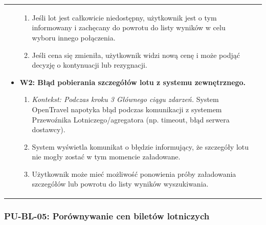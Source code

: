 \documentclass[a4paper,12pt]{article}
\begin{document}
\begin{longtable}{|p{\pierwszakolumnaszerokoscPUBLSzczegoly}|p{\drugakolumnaszerokoscPUBLSzczegoly}|}
\begin{itemize}
\begin{enumerate}
                    \item Jeśli lot jest całkowicie niedostępny, użytkownik jest o tym informowany i zachęcany do powrotu do listy wyników w celu wyboru innego połączenia.
                    \item Jeśli cena się zmieniła, użytkownik widzi nową cenę i może podjąć decyzję o kontynuacji lub rezygnacji.
                \end{enumerate}
            \item \textbf{W2: Błąd pobierania szczegółów lotu z systemu zewnętrznego.}
                \begin{enumerate} \itemsep0pt \parskip0pt \parsep0pt
                    \item \textit{Kontekst: Podczas kroku 3 Głównego ciągu zdarzeń.} System OpenTravel napotyka błąd podczas komunikacji z systemem Przewoźnika Lotniczego/agregatora (np. timeout, błąd serwera dostawcy).
                    \item System wyświetla komunikat o błędzie informujący, że szczegóły lotu nie mogły zostać w tym momencie załadowane.
                    \item Użytkownik może mieć możliwość ponowienia próby załadowania szczegółów lub powrotu do listy wyników wyszukiwania.
                \end{enumerate}
        \end{itemize} \\
\end{longtable}
\endgroup

\subsubsection{PU-BL-05: Porównywanie cen biletów lotniczych}

\begingroup %
\small %
\renewcommand{\arraystretch}{1.2} %

\newlength{\pierwszakolumnaszerokoscPUBLPorownCen}
\setlength{\pierwszakolumnaszerokoscPUBLPorownCen}{4.0cm}

\newlength{\drugakolumnaszerokoscPUBLPorownCen}
\setlength{\drugakolumnaszerokoscPUBLPorownCen}{\dimexpr\textwidth-\pierwszakolumnaszerokoscPUBLPorownCen-2\tabcolsep-3\arrayrulewidth\relax}
\end{document}
